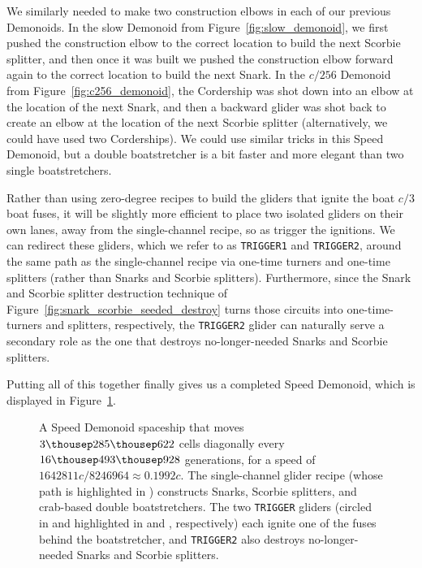 We similarly needed to make two construction elbows in each of our previous Demonoids. In the slow Demonoid from Figure~\ref{fig:slow_demonoid}, we first pushed the construction elbow to the correct location to build the next Scorbie splitter, and then once it was built we pushed the construction elbow forward again to the correct location to build the next Snark. In the $c/256$ Demonoid from Figure~\ref{fig:c256_demonoid}, the Cordership was shot down into an elbow at the location of the next Snark, and then a backward glider was shot back to create an elbow at the location of the next Scorbie splitter (alternatively, we could have used two Corderships). We could use similar tricks in this Speed Demonoid, but a double boatstretcher is a bit faster and more elegant than two single boatstretchers.

Rather than using zero-degree recipes to build the gliders that ignite the boat $c/3$ boat fuses, it will be slightly more efficient to place two isolated gliders on their own lanes, away from the single-channel recipe, so as trigger the ignitions. We can redirect these gliders, which we refer to as \texttt{TRIGGER1} and \texttt{TRIGGER2}, around the same path as the single-channel recipe via one-time turners and one-time splitters (rather than Snarks and Scorbie splitters). Furthermore, since the Snark and Scorbie splitter destruction technique of Figure~\ref{fig:snark_scorbie_seeded_destroy} turns those circuits into one-time-turners and splitters, respectively, the \texttt{TRIGGER2} glider can naturally serve a secondary role as the one that destroys no-longer-needed Snarks and Scorbie splitters.

Putting all of this together finally gives us a completed Speed Demonoid, which is displayed in Figure~\ref{fig:speed_demonoid}.

\begin{figure}[!htbp]
	\centering
	\caption{A Speed Demonoid spaceship that moves $3{\thousep}285{\thousep}622$ cells diagonally every $16{\thousep}493{\thousep}928$ generations, for a speed of $1642811c/8246964 \approx 0.1992c$. The single-channel glider recipe (whose path is highlighted in ) constructs Snarks, Scorbie splitters, and crab-based double boatstretchers. The two \texttt{TRIGGER} gliders (circled in  and highlighted in  and , respectively) each ignite one of the fuses behind the boatstretcher, and \texttt{TRIGGER2} also destroys no-longer-needed Snarks and Scorbie splitters.}\label{fig:speed_demonoid}
\end{figure}



